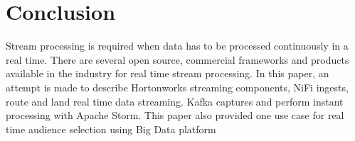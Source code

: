  
\section{Conclusion}

Stream processing is required when data has to be processed
continuously in a real time. There are several open source, commercial
frameworks and products available in the industry for real time stream
processing. In this paper, an attempt is made to describe Hortonworks
streaming components, NiFi ingests, route and land real time data
streaming. Kafka captures and perform instant processing with Apache
Storm. This paper also provided one use case for real time audience
selection using Big Data platform



 
